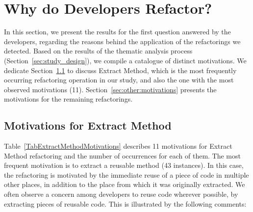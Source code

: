\section{Why do Developers Refactor?}

\begin{table}[htb]
\centering
\renewcommand{\arraystretch}{1.2}
\caption{{\textsc Extract Method} motivations}
\label{TabExtractMethodMotivations}
\footnotesize 

\end{table}

In this section, we present the results for the first question answered by the developers, regarding the reasons behind 
the application of the refactorings we detected. Based on the results of the thematic analysis process (Section~\ref{sec:study_design}), we compile a catalogue of \totalMotivationThemes distinct motivations.
We dedicate Section~\ref{SecExtractMethodMotivations} to discuss {\textsc Extract Method}, which is the most frequently 
occurring refactoring operation in our study, and also the one with the most observed motivations (11). 
Section~\ref{sec:other:motivations} presents the motivations for the remaining refactorings.


\subsection{Motivations for Extract Method}
\label{SecExtractMethodMotivations}
\begin{table}[htbp]
\centering
\renewcommand{\arraystretch}{1.2}
\caption{Motivations for {\textsc Move Class, Attribute, Method (MC, MA, MM)}, {\textsc Rename Package (RP)} {\textsc Inline Method (IM)}, {\textsc Extract Superclass, Interface (ES, EI)}, {\textsc Pull Up Method, Attribute (PUM, PUA)}, {\textsc Push Down Attribute, Method (PDA, PDM)} }
\label{TabOtherMotivations}
\footnotesize
\resizebox{\linewidth}{!}{

}
\end{table}


Table~\ref{TabExtractMethodMotivations} describes 11 motivations for {\textsc Extract Method} refactoring and the number of occurrences for each of them. 
The most frequent motivation is to extract a reusable method (43 instances).
In this case, the refactoring is motivated by the immediate reuse of a piece of code
in multiple other places, in addition to the place from which it was originally extracted.
We often observe a concern among developers to reuse code wherever possible, by extracting pieces of reusable code.
This is illustrated by the following comments:\margin

